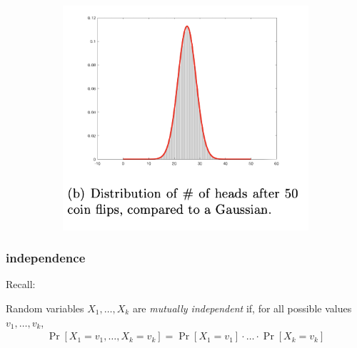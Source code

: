 \documentclass[compress]{beamer}
\begin{document}
\begin{frame}
\begin{figure}
\begin{subfigure}[t]{0.4\textwidth}
		\end{subfigure}
		\hspace{4em}
		\begin{subfigure}[t]{0.4\textwidth}
			\centering
			\includegraphics[width=\textwidth]{cltSkinny.png}
		\end{subfigure}
	\end{figure}
\end{frame}

\begin{frame}
	\frametitle{independence}
	Recall:
	\vspace{1em}
	\begin{definition}
		Random variables $X_1, \ldots, X_k$ are \emph{mutually independent} if, for all possible values $v_1, \ldots, v_k$,
		\begin{align*}
			\Pr[X_1 = v_1, \ldots, X_k = v_k] = 	\Pr[X_1 = v_1]\cdot\ldots \cdot\Pr[X_k = v_k]
		\end{align*}
	\end{definition}
	\begin{center}
	\end{center}
\end{frame}
\end{document}
